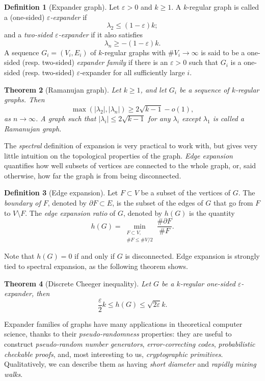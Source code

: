 \documentclass[10pt]{article}
\theoremstyle{plain}
\newtheorem{theorem}{Theorem}
\theoremstyle{definition}
\newtheorem{definition}[theorem]{Definition}
\begin{document}
\begin{definition}[Expander graph]
  Let $ε>0$ and $k≥1$. A $k$-regular graph is called a (one-sided)
  \emph{$ε$-expander} if
  \[λ_2≤(1-ε)k;\]
  and a \emph{two-sided $ε$-expander} if it also satisfies
  \[λ_n≥-(1-ε)k.\] %
  A sequence $G_i=(V_i,E_i)$ of $k$-regular graphs with $\#V_i\to∞$ is
  said to be a one-sided (resp. two-sided) \emph{expander family} if
  there is an $ε>0$ such that $G_i$ is a one-sided (resp. two-sided)
  $ε$-expander for all sufficiently large $i$.
\end{definition}

\begin{theorem}[Ramanujan graph]
  Let $k≥1$, and let $G_i$ be a sequence of $k$-regular graphs. %
  Then
  \[\max(|λ_2|,|λ_n|) ≥ 2\sqrt{k-1} - o(1),\]
  as $n\to ∞$. %
  A graph such that $|λ_i|≤2\sqrt{k-1}$ for any $λ_i$ except $λ_1$ is
  called a \emph{Ramanujan graph}.
\end{theorem}

The \emph{spectral} definition of expansion is very practical to work
with, but gives very little intuition on the topological properties of
the graph. %
\emph{Edge expansion} quantifies how well subsets of vertices are
connected to the whole graph, or, said otherwise, how far the graph is
from being disconnected.

\begin{definition}[Edge expansion]
  Let $F⊂V$ be a subset of the vertices of $G$. %
  The \emph{boundary of $F$}, denoted by $∂F⊂E$, is the subset of the
  edges of $G$ that go from $F$ to $V\setminus F$. %
  The \emph{edge expansion ratio} of $G$, denoted by $h(G)$ is the
  quantity
  \[h(G) = \min_{\substack{F⊂V,\\ \#F≤\#V/2}}\frac{\#∂F}{\#F}.\]
\end{definition}

Note that $h(G)=0$ if and only if $G$ is disconnected. %
Edge expansion is strongly tied to spectral expansion, as the
following theorem shows.

\begin{theorem}[Discrete Cheeger inequality]
  Let $G$ be a $k$-regular one-sided $ε$-expander, then
  \[\frac{ε}{2}k≤h(G)≤\sqrt{2ε}k.\]
\end{theorem}

Expander families of graphs have many applications in theoretical
computer science, thanks to their \emph{pseudo-randomness} properties:
they are useful to construct \emph{pseudo-random number generators},
\emph{error-correcting codes}, \emph{probabilistic checkable proofs},
and, most interesting to us, \emph{cryptographic primitives}. %
Qualitatively, we can describe them as having \emph{short diameter}
and \emph{rapidly mixing walks}.
\end{document}
